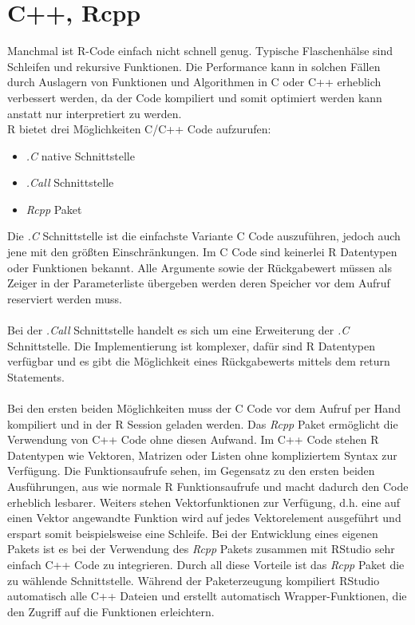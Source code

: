 \section{C++, Rcpp}
\label{kapitel:rcpp}
Manchmal ist R-Code einfach nicht schnell genug. Typische Flaschenhälse sind Schleifen und rekursive Funktionen. Die Performance kann in solchen Fällen durch Auslagern von Funktionen und Algorithmen in C oder C++ erheblich verbessert werden, da der Code kompiliert und somit optimiert werden kann anstatt nur interpretiert zu werden.\\
R bietet drei Möglichkeiten C/C++ Code aufzurufen:
\begin{itemize}
	\item \emph{.C} native Schnittstelle
	\item \emph{.Call} Schnittstelle
	\item \emph{Rcpp} Paket
\end{itemize}
Die \emph{.C} Schnittstelle ist die einfachste Variante C Code auszuführen, jedoch auch jene mit den größten Einschränkungen. Im C Code sind keinerlei R Datentypen oder Funktionen bekannt. Alle Argumente sowie der Rückgabewert müssen als Zeiger in der Parameterliste übergeben werden deren Speicher vor dem Aufruf reserviert werden muss.
\\
\\
Bei der \emph{.Call} Schnittstelle handelt es sich um eine Erweiterung der \emph{.C} Schnittstelle. Die Implementierung ist komplexer, dafür sind R Datentypen verfügbar und es gibt die Möglichkeit eines Rückgabewerts mittels dem return Statements. \cite{wickham2015r}
\\
\\
Bei den ersten beiden Möglichkeiten muss der C Code vor dem Aufruf per Hand kompiliert und in der R Session geladen werden. Das \emph{Rcpp} Paket ermöglicht die Verwendung von C++ Code ohne diesen Aufwand. Im C++ Code stehen R Datentypen wie Vektoren, Matrizen oder Listen ohne kompliziertem Syntax zur Verfügung. Die Funktionsaufrufe sehen, im Gegensatz zu den ersten beiden Ausführungen, aus wie normale R Funktionsaufrufe und macht dadurch den Code erheblich lesbarer. Weiters stehen Vektorfunktionen zur Verfügung, d.h. eine auf einen Vektor angewandte Funktion wird auf jedes Vektorelement ausgeführt und erspart somit beispielsweise eine Schleife. Bei der Entwicklung eines eigenen Pakets ist es bei der Verwendung des \emph{Rcpp} Pakets zusammen mit RStudio sehr einfach C++ Code zu integrieren. Durch all diese Vorteile ist das \emph{Rcpp} Paket die zu wählende Schnittstelle. Während der Paketerzeugung kompiliert RStudio automatisch alle C++ Dateien und erstellt automatisch Wrapper-Funktionen, die den Zugriff auf die Funktionen erleichtern.
